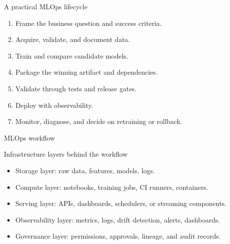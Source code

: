 \begin{frame}{A practical MLOps lifecycle}
\begin{enumerate}
\item Frame the business question and success criteria.
\item Acquire, validate, and document data.
\item Train and compare candidate models.
\item Package the winning artifact and dependencies.
\item Validate through tests and release gates.
\item Deploy with observability.
\item Monitor, diagnose, and decide on retraining or rollback.
\end{enumerate}
\coursefooter
\end{frame}

\begin{frame}{MLOps workflow}
\centering
{}
\coursefooter
\end{frame}

\begin{frame}{Infrastructure layers behind the workflow}
\begin{itemize}
\item Storage layer: raw data, features, models, logs.
\item Compute layer: notebooks, training jobs, CI runners, containers.
\item Serving layer: APIs, dashboards, schedulers, or streaming components.
\item Observability layer: metrics, logs, drift detection, alerts, dashboards.
\item Governance layer: permissions, approvals, lineage, and audit records.
\end{itemize}
\coursefooter
\end{frame}

